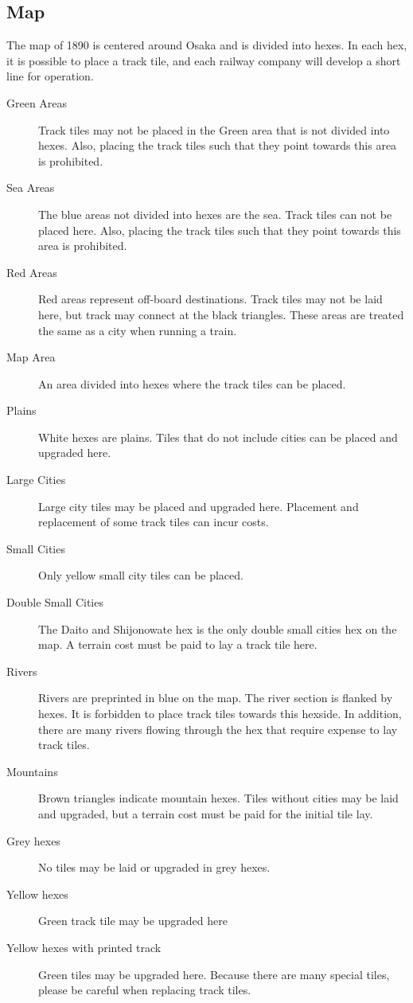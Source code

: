 \documentclass{article}
\begin{document}
\begin{CJK}{UTF8}{min}
\subsection{Map}

The map of 1890 is centered around Osaka and is divided into
hexes. In each hex, it is possible to place a track tile, and each
railway company will develop a short line for operation.

\begin{description}
\item[Green Areas] Track tiles may not be placed in the Green area
  that is not divided into hexes. Also, placing the track tiles such
  that they point towards this area is prohibited.
\item[Sea Areas] The blue areas not divided into hexes are the
  sea. Track tiles can not be placed here. Also, placing the track
  tiles such that they point towards this area is prohibited.
\item[Red Areas] Red areas represent off-board destinations. Track
  tiles may not be laid here, but track may connect at the black
  triangles. These areas are treated the same as a city when running a
  train.
\item[Map Area] An area divided into hexes where the track
  tiles can be placed.
\item[Plains] White hexes are plains. Tiles that do not include cities
  can be placed and upgraded here.
\item[Large Cities] Large city tiles may be placed and upgraded
  here. Placement and replacement of some track tiles can incur costs.
\item[Small Cities] Only yellow small city tiles can be placed.
\item[Double Small Cities] The Daito and Shijonowate hex is the only
  double small cities hex on the map. A terrain cost must be paid to
  lay a track tile here.
\item[Rivers] Rivers are preprinted in blue on the map. The river
  section is flanked by hexes. It is forbidden to place track tiles
  towards this hexside. In addition, there are many rivers flowing
  through the hex that require expense to lay track tiles.
\item[Mountains] Brown triangles indicate mountain hexes. Tiles
  without cities may be laid and upgraded, but a terrain cost must be
  paid for the initial tile lay.
\item[Grey hexes] No tiles may be laid or upgraded in grey hexes.
\item[Yellow hexes] Green track tile may be upgraded here
\item[Yellow hexes with printed track] Green tiles may be upgraded
  here. Because there are many special tiles, please be careful when
  replacing track tiles.
\end{description}


\end{CJK}
\end{document}
